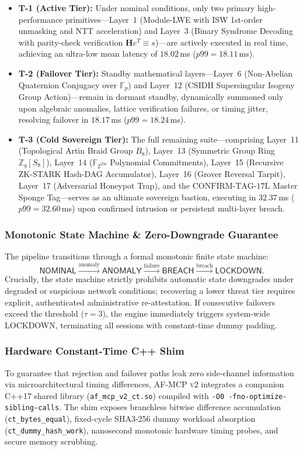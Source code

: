 \documentclass{ieeeaccess}
\newcommand{\Z}{\mathbb{Z}}
\newcommand{\F}{\mathbb{F}}
\begin{document}
\begin{itemize}
  \item \textbf{T-1 (Active Tier):} Under nominal conditions, only two primary high-performance primitives---Layer~1 (Module-LWE with ISW 1st-order unmasking and NTT acceleration) and Layer~3 (Binary Syndrome Decoding with parity-check verification $\mathbf{H} e^T \equiv s$)---are actively executed in real time, achieving an ultra-low mean latency of $18.02$\,ms ($p99 = 18.11$\,ms).
  \item \textbf{T-2 (Failover Tier):} Standby mathematical layers---Layer~6 (Non-Abelian Quaternion Conjugacy over $\F_p$) and Layer~12 (CSIDH Supersingular Isogeny Group Action)---remain in dormant standby, dynamically summoned only upon algebraic anomalies, lattice verification failures, or timing jitter, resolving failover in $18.17$\,ms ($p99 = 18.24$\,ms).
  \item \textbf{T-3 (Cold Sovereign Tier):} The full remaining suite---comprising Layer~11 (Topological Artin Braid Group $B_8$), Layer~13 (Symmetric Group Ring $\Z_q[S_8]$), Layer~14 ($\F_{2^{256}}$ Polynomial Commitments), Layer~15 (Recursive ZK-STARK Hash-DAG Accumulator), Layer~16 (Grover Reversal Tarpit), Layer~17 (Adversarial Honeypot Trap), and the $\text{CONFIRM-TAG-17L}$ Master Sponge Tag---serves as an ultimate sovereign bastion, executing in $32.37$\,ms ($p99 = 32.60$\,ms) upon confirmed intrusion or persistent multi-layer breach.
\end{itemize}

\subsubsection{Monotonic State Machine \& Zero-Downgrade Guarantee}
The pipeline transitions through a formal monotonic finite state machine:
\begin{equation}
  \mathsf{NOMINAL} \xrightarrow{\text{anomaly}} \mathsf{ANOMALY} \xrightarrow{\text{failure}} \mathsf{BREACH} \xrightarrow{\text{breach}} \mathsf{LOCKDOWN}.
\end{equation}
Crucially, the state machine strictly prohibits automatic state downgrades under degraded or suspicious network conditions; recovering a lower threat tier requires explicit, authenticated administrative re-attestation. If consecutive failovers exceed the threshold ($\tau = 3$), the engine immediately triggers system-wide \textsf{LOCKDOWN}, terminating all sessions with constant-time dummy padding.

\subsubsection{Hardware Constant-Time C++ Shim}
To guarantee that rejection and failover paths leak zero side-channel information via microarchitectural timing differences, \textsc{AF-MCP v2} integrates a companion C++17 shared library (\texttt{af\_mcp\_v2\_ct.so}) compiled with \texttt{-O0 -fno-optimize-sibling-calls}. The shim exposes branchless bitwise difference accumulation (\texttt{ct\_bytes\_equal}), fixed-cycle SHA3-256 dummy workload absorption (\texttt{ct\_dummy\_hash\_work}), nanosecond monotonic hardware timing probes, and secure memory scrubbing.
\end{document}

